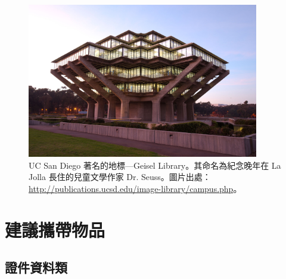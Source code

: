 \documentclass[10pt,a4paper]{book}
\begin{document}
\begin{CJK}{UTF8}{bkai}
\begin{figure}[b]
\centering
\includegraphics[width=0.9\textwidth]{Pics/geisel-hr}
\caption{UC San Diego 著名的地標---Geisel Library。其命名為紀念晚年在 La Jolla 長住的兒童文學作家 Dr. Seuss。圖片出處：\url{http://publications.ucsd.edu/image-library/campus.php}。}
\end{figure}

\chapter{建議攜帶物品}

\section{證件資料類}


\end{CJK}
\end{document}
